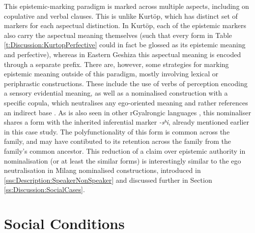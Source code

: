 This epistemic-marking paradigm is marked across multiple aspects, including on copulative and verbal clauses. This is unlike Kurtöp, which has distinct set of markers for each aspectual distinction. In Kurtöp, each of the epistemic markers also carry the aspectual meaning themselves (such that every form in Table \ref{t:Discussion:KurtopPerfective} could in fact be glossed as its epistemic meaning and perfective), whereas in Eastern Geshiza this aspectual meaning is encoded through a separate prefix. There are, however, some strategies for marking epistemic meaning outside of this paradigm, mostly involving lexical or periphrastic constructions. These include the use of verbs of perception encoding a sensory evidential meaning, as well as a nominalised construction with a specific copula, which neutralises any ego-oriented meaning and rather references an indirect base \cite[596]{Honkasalo2019}. As is also seen in other rGyalrongic languages \cites{Lai2017}{Gates2021}{Zhang2022}, this nominaliser shares a form with the inherited inferential marker \textit{-sʰi}, already mentioned earlier in this case study. The polyfunctionality of this form is common across the family, and may have contibuted to its retention across the family from the family's common ancestor. This reduction of a claim over epistemic authority in nominalisation (or at least the similar forms) is interestingly similar to the ego neutralisation in Milang nominalised constructions, introduced in \ref{sss:Description:SpeakerNonSpeaker} and discussed further in Section \ref{ss:Discussion:SocialCases}.


\section{Social Conditions}\label{s:Discussion:Social}
